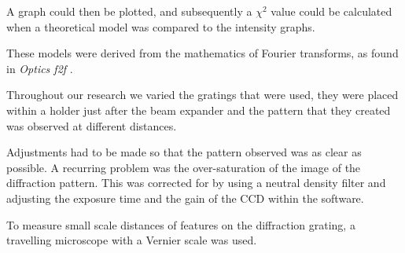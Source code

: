\documentclass[twocolumn]{revtex4}
\begin{document}
A graph could then be plotted, and subsequently a $\chi^2$ value could be calculated when a theoretical model was compared to the intensity graphs.

These models were derived from the mathematics of Fourier transforms, as found in \textit{Optics f2f} \cite{of2f}.

Throughout our research we varied the gratings that were used, they were placed within a holder just after the beam expander and the pattern that they created was observed at different distances. 

Adjustments had to be made so that the pattern observed was as clear as possible. A recurring problem was the over-saturation of the image of the diffraction pattern. This was corrected for by using a neutral density filter and adjusting the exposure time and the gain of the CCD within the software.

To measure small scale distances of features on the diffraction grating, a travelling microscope with a Vernier scale was used.

\vspace{-3ex}
\end{document}
